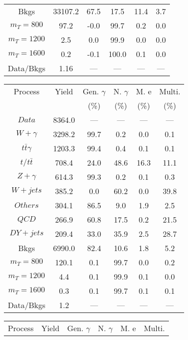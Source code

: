 \begin{figure}
\begin{minipage}[c]{0.32\textwidth}
{\begin{tabular}{cccccc}
Bkgs &  33107.2 &  67.5 &  17.5 &  11.4 &  3.7\\
$ m_{T} = 800 $ &  97.2 &  -0.0 &  99.7 &  0.2 &  0.0\\
$ m_{T} = 1200 $ &  2.5 &  0.0 &  99.9 &  0.0 &  0.0\\
$ m_{T} = 1600 $ &  0.2 &  -0.1 &  100.0 &  0.1 &  0.0\\
Data/Bkgs &  1.16 &  --- &  --- &  --- &  ---\\
\hline
\end{tabular}
}
\end{minipage}
\begin{minipage}[c]{0.32\textwidth}
\centering
\tiny{
\begin{tabular}{cccccc}
\hline
Process & Yield & Gen. $\gamma$ & N. $\gamma$ & M. e & Multi. \\
 &  & (\%) & (\%) & (\%) & (\%)  \\
\hline
                                                                      $ Data $ &  8364.0 &  --- &  --- &  --- &  ---\\
$ W+\gamma $ &  3298.2 &  99.7 &  0.2 &  0.0 &  0.1\\
$ t\bar{t}\gamma $ &  1203.3 &  99.4 &  0.4 &  0.1 &  0.1\\
$ t/t\bar{t} $ &  708.4 &  24.0 &  48.6 &  16.3 &  11.1\\
$ Z+\gamma $ &  614.3 &  99.3 &  0.2 &  0.1 &  0.3\\
$ W+jets $ &  385.2 &  0.0 &  60.2 &  0.0 &  39.8\\
$ Others $ &  304.1 &  86.5 &  9.0 &  1.9 &  2.5\\
$ QCD $ &  266.9 &  60.8 &  17.5 &  0.2 &  21.5\\
$ DY+jets $ &  209.4 &  33.0 &  35.9 &  2.5 &  28.7\\
Bkgs &  6990.0 &  82.4 &  10.6 &  1.8 &  5.2\\
$ m_{T} = 800 $ &  120.1 &  0.1 &  99.7 &  0.0 &  0.2\\
$ m_{T} = 1200 $ &  4.4 &  0.1 &  99.9 &  0.1 &  0.0\\
$ m_{T} = 1600 $ &  0.3 &  0.1 &  99.7 &  0.1 &  0.1\\
Data/Bkgs &  1.2 &  --- &  --- &  --- &  ---\\
\hline
\end{tabular}
}
\end{minipage}
\begin{minipage}[c]{0.32\textwidth}
\centering
\tiny{
\begin{tabular}{cccccc}
\hline
Process & Yield & Gen. $\gamma$ & N. $\gamma$ & M. e & Multi. \\

\end{tabular}}
\end{minipage}
\end{figure}
